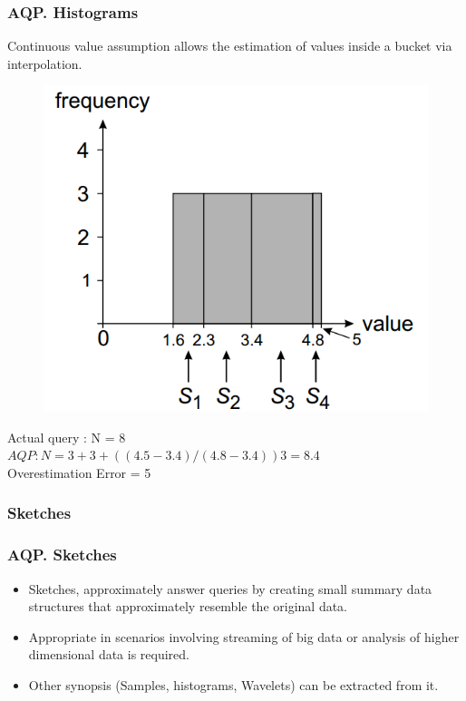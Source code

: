\documentclass{beamer}
\begin{document}
\begin{frame}
\frametitle{AQP. Histograms}
Continuous value assumption allows the estimation of values inside a bucket via interpolation.
\begin{figure}
  \centering
  \includegraphics[scale=0.30]{img/Blinktopus-EquiDepth.png}
\end{figure}
Actual query : N = 8\\
$ AQP: N = 3 + 3 + ((4.5 − 3.4)/(4.8 − 3.4))3 = 8.4$\\
Overestimation Error = 5%
\end{frame}

\subsubsection{Sketches}
\begin{frame}
\frametitle{AQP. Sketches}
\begin{itemize}
		\item{Sketches, approximately answer queries by creating small summary data structures that approximately resemble the original data.}
		\item{Appropriate in scenarios involving streaming of big data or analysis of higher dimensional data is required.}
		\item{Other synopsis (Samples, histograms, Wavelets) can be extracted from it.}
\end{itemize}

\end{frame}
\end{document}
